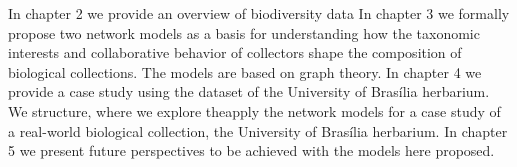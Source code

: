 In chapter 2 we provide an overview of biodiversity data
%
In chapter 3 we formally propose two network models as a basis for understanding how the taxonomic interests and collaborative behavior of collectors shape the composition of biological collections.
The models are based on graph theory.
%
In chapter 4 we provide a case study using the dataset of the University of Brasília herbarium.
We structure, where we explore theapply the network models for a case study of a real-world biological collection, the University of Brasília herbarium.
%
In chapter 5 we present future perspectives to be achieved with the models here proposed.





